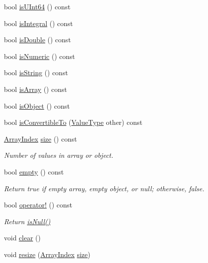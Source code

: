 \begin{DoxyCompactItemize}
bool \hyperlink{class_json_1_1_value_aa35efece2a6cba4d988d7d5b54db2fb8}{is\-U\-Int64} () const 
\item 
bool \hyperlink{class_json_1_1_value_aec4f74ef7b776b1d9c8a10fc3bb4add5}{is\-Integral} () const 
\item 
bool \hyperlink{class_json_1_1_value_a0ea567fa51fc808851698bef59b43626}{is\-Double} () const 
\item 
bool \hyperlink{class_json_1_1_value_a8ce848900e2e8fa23a41fcc2c1409fab}{is\-Numeric} () const 
\item 
bool \hyperlink{class_json_1_1_value_a06c01d7c1e8151a5844b595ab00f46c7}{is\-String} () const 
\item 
bool \hyperlink{class_json_1_1_value_ac8c898f93543e55b67418f94bced20af}{is\-Array} () const 
\item 
bool \hyperlink{class_json_1_1_value_a80cffaa0402b80317c0437216bbb6d92}{is\-Object} () const 
\item 
bool \hyperlink{class_json_1_1_value_a7ec153803631a27abf58cba2bb1af70c}{is\-Convertible\-To} (\hyperlink{namespace_json_a7d654b75c16a57007925868e38212b4e}{Value\-Type} other) const 
\item 
\hyperlink{class_json_1_1_value_a184a91566cccca7b819240f0d5561c7d}{Array\-Index} \hyperlink{class_json_1_1_value_a4ca8ee6c48a34ca6c2f131956bab5e05}{size} () const 
\begin{DoxyCompactList}\small\item\em Number of values in array or object. \end{DoxyCompactList}\item 
bool \hyperlink{class_json_1_1_value_a99c42d3ff8495dad1e91b43e66553c36}{empty} () const 
\begin{DoxyCompactList}\small\item\em Return true if empty array, empty object, or null; otherwise, false. \end{DoxyCompactList}\item 
bool \hyperlink{class_json_1_1_value_a021ab0d15a807fbe051446c9c545ab61}{operator!} () const 
\begin{DoxyCompactList}\small\item\em Return \hyperlink{class_json_1_1_value_aeb9ad8b1bb91bdd72203dc884b3f4362}{is\-Null()} \end{DoxyCompactList}\item 
void \hyperlink{class_json_1_1_value_a501a4d67e6c875255c2ecc03ccd2019b}{clear} ()
\item 
void \hyperlink{class_json_1_1_value_aa284353271ada427dbfa04a42f2be407}{resize} (\hyperlink{class_json_1_1_value_a184a91566cccca7b819240f0d5561c7d}{Array\-Index} \hyperlink{class_json_1_1_value_a4ca8ee6c48a34ca6c2f131956bab5e05}{size})

\end{DoxyCompactItemize}
